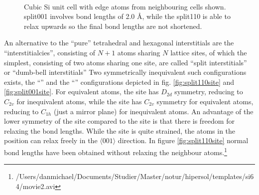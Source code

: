 \documentclass[11pt,bibliography=totoc,index=totoc]{scrbook}   %
\begin{document}

\begin{figure}[htp]
  \centering
  \\
  \caption{Cubic Si unit cell with edge atoms from neighbouring cells shown.
  split001 involves bond lengths of 2.0 Å,
  while the split110 is able to relax upwards so the final bond lengths are not shortened.
  }
  \label{fig:interstitials}
\end{figure}

An alternative to the ``pure'' tetrahedral and hexagonal interstitials are the ``interstitialcies'', consisting of $N+1$ atoms sharing $N$ lattice sites, of which the simplest, consisting of two atoms sharing one site, are called ``split interstitials'' or ``dumb-bell interstitials''\cite[6]{Pichler:2004}
Two symmetrically inequivalent such configurations exists, the ``'' and the ``'' configurations depicted in fig. \ref{fig:split110site} and \ref{fig:split001site}.
For equivalent atoms, the  site has $D_{2d}$ symmetry, reducing to $C_{2v}$ for inequivalent atoms,
while the  site has $C_{2v}$ symmetry for equivalent atoms, reducing to $C_{1h}$ (just a mirror plane) for inequivalent atoms.
An advantage of the lower symmetry of the  site compared to the  site is that there is freedom for relaxing the bond lengths. 
While the  site is quite strained, the atoms in the  position can relax freely in the $\langle 001 \rangle$ direction. 
In figure \ref{fig:split110site} normal bond lengths have been obtained without relaxing the neighbour atoms.\footnote{
/Users/danmichael/Documents/Studier/Master/notur/hipersol/templates/si64/movie2.avi }
\end{document}
